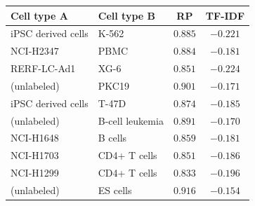 \documentclass[12pt]{article}
\begin{document}
\begin{table}[!htbp]
\begin{minipage}[t]{0.485\textwidth}
\begin{tabular}{llcc}
    \toprule
    Cell type A & Cell type B & RP & TF-IDF \\
    \midrule
    iPSC derived cells & K-562           & $0.885$ & $-0.221$ \\
    NCI-H2347          & PBMC            & $0.884$ & $-0.181$ \\
    RERF-LC-Ad1        & XG-6            & $0.851$ & $-0.224$ \\
    (unlabeled)        & PKC19           & $0.901$ & $-0.171$ \\
    iPSC derived cells & T-47D           & $0.874$ & $-0.185$ \\
    (unlabeled)        & B-cell leukemia & $0.891$ & $-0.170$ \\
    NCI-H1648          & B cells         & $0.859$ & $-0.181$ \\
    NCI-H1703          & CD4+ T cells    & $0.851$ & $-0.186$ \\
    NCI-H1299          & CD4+ T cells    & $0.833$ & $-0.196$ \\
    (unlabeled)        & ES cells        & $0.916$ & $-0.154$ \\
    \bottomrule
    \end{tabular}
  \end{minipage}
\end{table}
\end{document}
